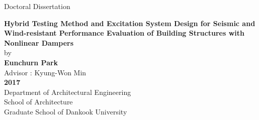 \begin{titlepage}
\begin{flushright}
\vspace*{1.5cm}
\large{Doctoral Dissertation} \\
\end{flushright}
\begin{center}
\vspace*{1.0cm}
\noindent \LARGE{\textbf{Hybrid Testing Method and Excitation System Design for Seismic and Wind-resistant Performance Evaluation of Building Structures with Nonlinear Dampers}} \\
\vspace*{2.0cm}
\noindent \Large{by}\\
\vspace*{0.1cm}
\noindent \Large{\textbf{Eunchurn Park}}\\
\vspace*{0.1cm}
\noindent \Large{Advisor : Kyung-Won Min} \\
\vspace*{2.0cm}
\noindent \Large \textbf{2017} \\
\vspace*{2.0cm}
\noindent \Large {Department of Architectural Engineering} \\
\vspace*{0.1cm}
\noindent \Large {School of Architecture} \\
\vspace*{0.1cm}
\noindent \Large {Graduate School of Dankook University} \\
\end{center}
\end{titlepage}